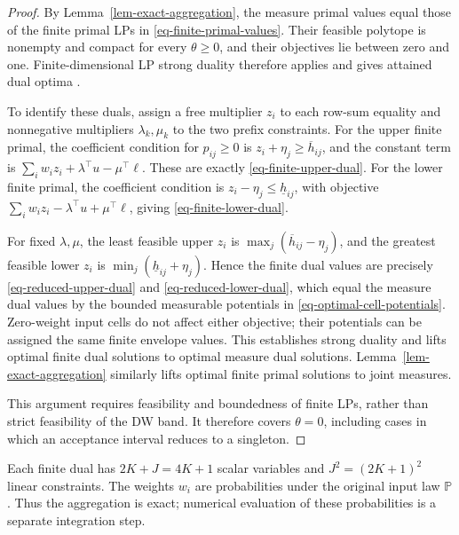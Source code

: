 \begin{proof}
  By Lemma~\ref{lem-exact-aggregation}, the measure primal values equal those of the finite primal LPs in \eqref{eq-finite-primal-values}. Their feasible polytope is nonempty and compact for every $\theta\ge0$, and their objectives lie between zero and one. Finite-dimensional LP strong duality therefore applies and gives attained dual optima \citep[Section~5.2.3]{B.V04}.

  To identify these duals, assign a free multiplier $z_i$ to each row-sum equality and nonnegative multipliers $\lambda_k,\mu_k$ to the two prefix constraints. For the upper finite primal, the coefficient condition for $p_{ij}\ge0$ is
  $z_i+\eta_j\ge\overline h_{ij}$, and the constant term is
  $\sum_iw_i z_i+\lambda^\top u-\mu^\top\ell$.
  These are exactly \eqref{eq-finite-upper-dual}. For the lower finite primal, the coefficient condition is
  $z_i-\eta_j\le\underline h_{ij}$, with objective
  $\sum_iw_i z_i-\lambda^\top u+\mu^\top\ell$,
  giving \eqref{eq-finite-lower-dual}.

  For fixed $\lambda,\mu$, the least feasible upper $z_i$ is
  $\max_j(\overline h_{ij}-\eta_j)$, and the greatest feasible lower $z_i$ is
  $\min_j(\underline h_{ij}+\eta_j)$.
  Hence the finite dual values are precisely \eqref{eq-reduced-upper-dual} and \eqref{eq-reduced-lower-dual}, which equal the measure dual values by the bounded measurable potentials in \eqref{eq-optimal-cell-potentials}. Zero-weight input cells do not affect either objective; their potentials can be assigned the same finite envelope values. This establishes strong duality and lifts optimal finite dual solutions to optimal measure dual solutions. Lemma~\ref{lem-exact-aggregation} similarly lifts optimal finite primal solutions to joint measures.

  This argument requires feasibility and boundedness of finite LPs, rather than strict feasibility of the DW band. It therefore covers $\theta=0$, including cases in which an acceptance interval reduces to a singleton.
\end{proof}

Each finite dual has $2K+J=4K+1$ scalar variables and $J^2=(2K+1)^2$ linear constraints. The weights $w_i$ are probabilities under the original input law $\mathbb P$. Thus the aggregation is exact; numerical evaluation of these probabilities is a separate integration step.

